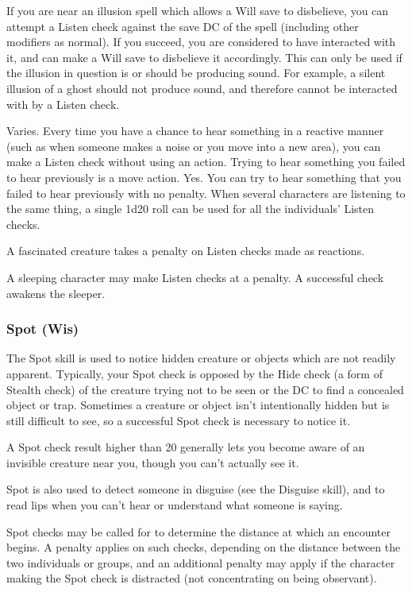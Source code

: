  If you are near an illusion spell which allows a Will save to disbelieve, you can attempt a Listen check against the save DC of the spell (including other modifiers as normal). If you succeed, you are considered to have interacted with it, and can make a Will save to disbelieve it accordingly. This can only be used if the illusion in question is or should be producing sound. For example, a silent illusion of a ghost should not produce sound, and therefore cannot be interacted with by a Listen check.

 Varies. Every time you have a chance to hear something in a reactive manner (such as when someone makes a noise or you move into a new area), you can make a Listen check without using an action. Trying to hear something you failed to hear previously is a move action.
 Yes. You can try to hear something that you failed to hear previously with no penalty.
 When several characters are listening to the same thing, a single 1d20 roll can be used for all the individuals' Listen checks.
\par A fascinated creature takes a   penalty on Listen checks made as reactions.
\par A sleeping character may make Listen checks at a  penalty. A successful check awakens the sleeper.

\subsubsection{Spot (Wis)}
 The Spot skill is used to notice hidden creature or objects which are not readily apparent. Typically, your Spot check is opposed by the Hide check (a form of Stealth check) of the creature trying not to be seen or the DC to find a concealed object or trap. Sometimes a creature or object isn't intentionally hidden but is still difficult to see, so a successful Spot check is necessary to notice it.

A Spot check result higher than 20 generally lets you become aware of an invisible creature near you, though you can't actually see it.

Spot is also used to detect someone in disguise (see the Disguise skill), and to read lips when you can't hear or understand what someone is saying.

Spot checks may be called for to determine the distance at which an encounter begins. A penalty applies on such checks, depending on the distance between the two individuals or groups, and an additional penalty may apply if the character making the Spot check is distracted (not concentrating on being observant).

